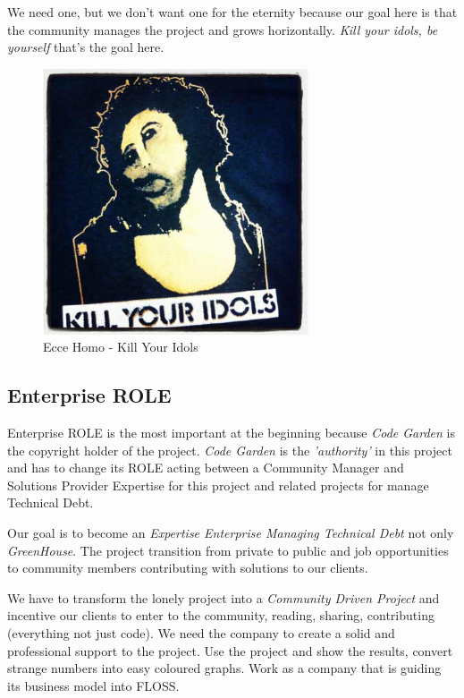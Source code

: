 \documentclass[11pt]{scrartcl}
\begin{document}
\par We need one, but we don't want one for the eternity because our goal here is that the community manages the project and grows horizontally. \emph{Kill your idols, be yourself} that's the goal here.

\begin{figure}[H]
\centering
\includegraphics[width=0.7\textwidth]{killyouridols.jpg}
\caption{Ecce Homo - Kill Your Idols}
\label{kill-your-idols}
\end{figure}


\subsection{Enterprise ROLE}
\label{sub:enterprise-role}

\par Enterprise ROLE is the most important at the beginning because \emph{Code Garden} is the copyright holder of the project. \emph{Code Garden} is the \emph{'authority'} in this project and has to change its ROLE acting between a Community Manager and Solutions Provider Expertise for this project and related projects for manage Technical Debt.

\par Our goal is to become an \emph{Expertise Enterprise Managing Technical Debt} not only \emph{GreenHouse}. The project transition from private to public and job opportunities to community members contributing with solutions to our clients.

\par We have to transform the lonely project into a \emph{Community Driven Project} and incentive our clients to enter to the community, reading, sharing, contributing (everything not just code). We need the company to create a solid and professional support to the project. Use the project and show the results, convert strange numbers into easy coloured graphs. Work as a company that is guiding its business model into FLOSS.
\end{document}
